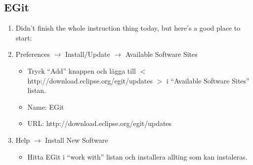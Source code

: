 \documentclass[11pt]{amsart}
\begin{document}
\subsection{EGit}
\begin{enumerate}
\item[] Didn't finish the whole instruction thing today, but here's a good place to start:  
{}

\item Preferences $\rightarrow$ Install/Update $\rightarrow$ Available Software Sites
	\begin{itemize}
	\item Tryck ``Add'' knappen och l\"{a}gga till $<$ http://download.eclipse.org/egit/updates $>$ i ``Available Software Sites'' listan. 
	\item Name: EGit 
	\item URL: http://download.eclipse.org/egit/updates
	\end{itemize}

\item Help $\rightarrow$ Install New Software
	\begin{itemize}
	\item Hitta EGit i ``work with'' listan och installera allting som kan
	instaleras.
	\end{itemize}
	

\end{enumerate}
\end{document}
